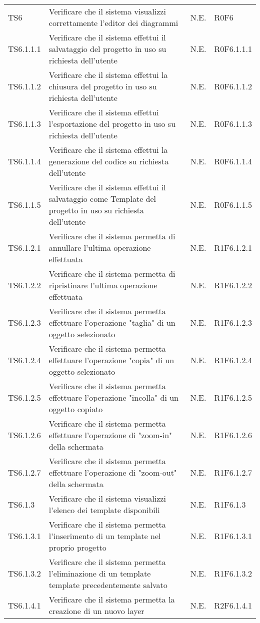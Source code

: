 \begin{longtable}{p{2.5cm}!{\VRule[1pt]}p{6.5cm}!{\VRule[1pt]}p{1cm}!{\VRule[1pt]}p{3cm}}
TS6 & Verificare che il sistema visualizzi correttamente l'editor dei diagrammi & N.E. & R0F6\\
TS6.1.1.1 & Verificare che il sistema effettui il salvataggio del progetto in uso su richiesta dell'utente & N.E. & R0F6.1.1.1\\
TS6.1.1.2 & Verificare che il sistema effettui la chiusura del progetto in uso su richiesta dell'utente & N.E. & R0F6.1.1.2\\
TS6.1.1.3 & Verificare che il sistema effettui l'esportazione del progetto in uso su richiesta dell'utente & N.E. & R0F6.1.1.3\\
TS6.1.1.4 & Verificare che il sistema effettui la generazione del codice su richiesta dell'utente & N.E. & R0F6.1.1.4\\
TS6.1.1.5 & Verificare che il sistema effettui il salvataggio come Template del progetto in uso su richiesta dell'utente & N.E. & R0F6.1.1.5\\
TS6.1.2.1 & Verificare che il sistema permetta di annullare l'ultima operazione effettuata & N.E. & R1F6.1.2.1\\
TS6.1.2.2 & Verificare che il sistema permetta di ripristinare l'ultima operazione effettuata & N.E. & R1F6.1.2.2\\
TS6.1.2.3 & Verificare che il sistema permetta effettuare l'operazione "taglia" di un oggetto selezionato & N.E. & R1F6.1.2.3\\
TS6.1.2.4 & Verificare che il sistema permetta effettuare l'operazione "copia" di un oggetto selezionato & N.E. & R1F6.1.2.4\\
TS6.1.2.5 & Verificare che il sistema permetta effettuare l'operazione "incolla" di un oggetto copiato & N.E. & R1F6.1.2.5\\
TS6.1.2.6 & Verificare che il sistema permetta effettuare l'operazione di "zoom-in" della schermata & N.E. & R1F6.1.2.6\\
TS6.1.2.7 & Verificare che il sistema permetta effettuare l'operazione di "zoom-out" della schermata & N.E. & R1F6.1.2.7\\
TS6.1.3 & Verificare che il sistema visualizzi l'elenco dei template disponibili & N.E. & R1F6.1.3 \\
TS6.1.3.1 & Verificare che il sistema permetta l'inserimento di un template nel proprio progetto& N.E. & R1F6.1.3.1 \\
TS6.1.3.2 & Verificare che il sistema permetta l'eliminazione di un template template precedentemente salvato & N.E. & R1F6.1.3.2 \\
TS6.1.4.1 & Verificare che il sistema permetta la creazione di un nuovo layer & N.E. & R2F6.1.4.1 \\

\end{longtable}
